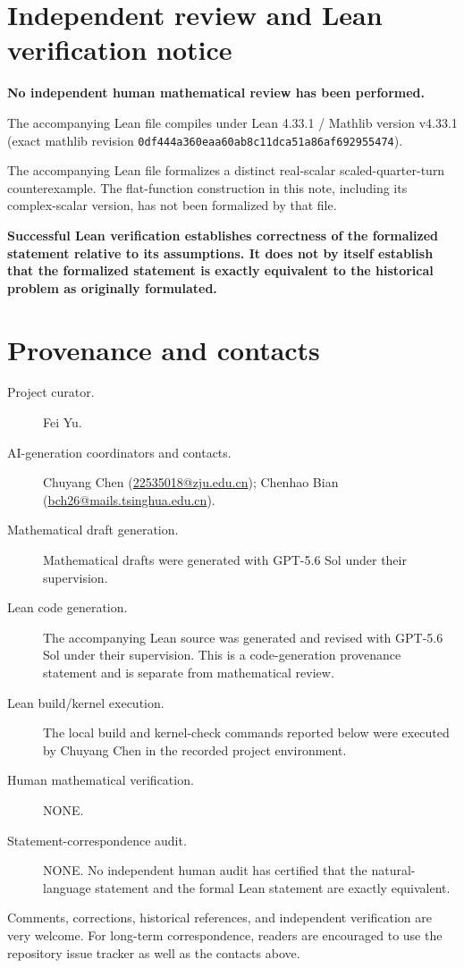 \documentclass[11pt]{article}
\theoremstyle{remark}
\begin{document}
\section*{Independent review and Lean verification notice}
\begingroup
\small
\begin{center}
\begin{minipage}{0.94\linewidth}
\centering
\textbf{\large No independent human mathematical review has been performed.}
\end{minipage}
\end{center}

\medskip
\noindent The accompanying Lean file compiles under Lean 4.33.1 / Mathlib version v4.33.1 (exact mathlib revision \texttt{0df444a360eaa60ab8c11dca51a86af692955474}).

\medskip
\noindent The accompanying Lean file formalizes a distinct real-scalar scaled-quarter-turn counterexample. The flat-function construction in this note, including its complex-scalar version, has not been formalized by that file.

\medskip
\noindent\textbf{Successful Lean verification establishes correctness of the formalized statement relative to its assumptions. It does not by itself establish that the formalized statement is exactly equivalent to the historical problem as originally formulated.}
\endgroup

\section*{Provenance and contacts}
\begingroup\small\sloppy
\begin{description}
\item[Project curator.] Fei Yu.
\item[AI-generation coordinators and contacts.] Chuyang Chen (\href{mailto:22535018@zju.edu.cn}{22535018@zju.edu.cn}); Chenhao Bian (\href{mailto:bch26@mails.tsinghua.edu.cn}{bch26@mails.tsinghua.edu.cn}).
\item[Mathematical draft generation.] Mathematical drafts were generated with GPT-5.6 Sol under their supervision.
\item[Lean code generation.] The accompanying Lean source was generated and revised with GPT-5.6 Sol under their supervision. This is a code-generation provenance statement and is separate from mathematical review.
\item[Lean build/kernel execution.] The local build and kernel-check commands reported below were executed by Chuyang Chen in the recorded project environment.
\item[Human mathematical verification.] NONE.
\item[Statement-correspondence audit.] NONE. No independent human audit has certified that the natural-language statement and the formal Lean statement are exactly equivalent.
\end{description}
\medskip
\noindent Comments, corrections, historical references, and independent verification are very welcome. For long-term correspondence, readers are encouraged to use the repository issue tracker as well as the contacts above.
\endgroup
\end{document}
